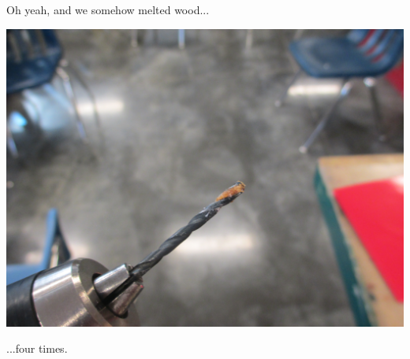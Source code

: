 Oh yeah, and we somehow melted wood...

\begin{center}
 \includegraphics[width=\textwidth]{./Entries/Images/meltedWood.JPG}
\end{center}

...four times.